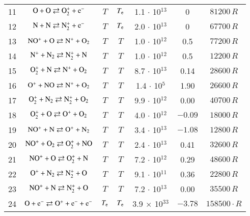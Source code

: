 \documentclass{warpdoc}
\begin{document}
\begin{table}[t]
\begin{center}
\begin{threeparttable}
\begin{tabular}{ccccccc}
11 & $\rm O + O \rightleftarrows O_2^+ + e^- $ & $T$ & $T_{\rm e}$ & 1.1 $\cdot$ 10$^{13}$  & 0 & $81200 \, R$ \\

12 & $\rm N + N \rightleftarrows N_2^+ + e^- $ & $T$ & $T_{\rm e}$ & 2.0 $\cdot$ 10$^{13}$  & 0 & $67700 \, R$ \\

13 & $\rm NO^+ + O \rightleftarrows N^+ + O_2 $ & $T$  & $T$ & 1.0 $\cdot$ 10$^{12}$  & 0.5 & $77200 \, R$ \\

14 & $\rm N^+ + N_2 \rightleftarrows N_2^+ + N $ & $T$  & $T$ & 1.0 $\cdot$ 10$^{12}$  & 0.5 & $12200 \, R$ \\

15 & $\rm O_2^+ + N \rightleftarrows N^+ + O_2 $ & $T$ & $T$  & 8.7 $\cdot$ 10$^{13}$  & 0.14 & $28600 \, R$ \\

16 & $\rm O^+ + NO \rightleftarrows N^+ + O_2 $ & $T$ & $T$  & 1.4 $\cdot$ 10$^{5}$  & 1.90 & $26600 \, R$ \\

17 & $\rm O_2^+ + N_2 \rightleftarrows N_2^+ + O_2 $ & $T$ & $T$  & 9.9 $\cdot$ 10$^{12}$  & 0.00 & $40700 \, R$ \\

18 & $\rm O_2^+ + O \rightleftarrows O^+ + O_2 $ & $T$ & $T$  & 4.0 $\cdot$ 10$^{12}$  & $-0.09$ & $18000 \, R$ \\

19 & $\rm NO^+ + N \rightleftarrows O^+ + N_2 $ & $T$ & $T$  & 3.4 $\cdot$ 10$^{13}$  & $-1.08$ & $12800 \, R$ \\

20 & $\rm NO^+ + O_2 \rightleftarrows O_2^+ + NO $ & $T$ & $T$  & 2.4 $\cdot$ 10$^{13}$  & 0.41 & $32600 \, R$ \\

21 & $\rm NO^+ + O \rightleftarrows O_2^+ + N $ & $T$ & $T$  & 7.2 $\cdot$ 10$^{12}$  & 0.29 & $48600 \, R$ \\

22 & $\rm O^+ + N_2 \rightleftarrows N_2^+ + O $ & $T$ & $T$ & 9.1 $\cdot$ 10$^{11}$  & 0.36 & $22800 \, R$ \\

23 & $\rm NO^+ + N \rightleftarrows N_2^+ + O $  & $T$ & $T$ & 7.2 $\cdot$ 10$^{13}$  & 0.00 & $35500 \, R$  \\

24 & $\rm O + e^- \rightleftarrows O^+ + e^- + e^- $ & $T_{\rm e}$ & $T_{\rm e}$ & 3.9 $\times$ 10$^{33}$  & $-3.78$ & $158500 \cdot R$ \\


\end{tabular}
\end{threeparttable}
\end{center}
\end{table}
\end{document}
